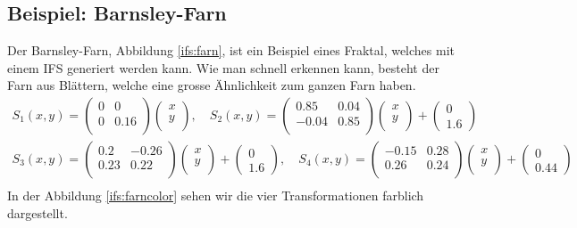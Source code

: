 \subsection{Beispiel: Barnsley-Farn}
Der Barnsley-Farn, Abbildung \ref{ifs:farn}, ist ein Beispiel eines Fraktal, welches mit einem IFS generiert werden kann.
Wie man schnell erkennen kann, besteht der Farn aus Blättern, welche eine grosse Ähnlichkeit zum ganzen Farn haben.
\begin{align*}
	{S_1(x,y)}
	= 
	\begin{pmatrix}
		0 & 0 \\
		0 & 0.16 \\
	\end{pmatrix}
	\begin{pmatrix}
		x\\
		y\\
	\end{pmatrix}, \quad
	{S_2(x,y)}
	= 
	\begin{pmatrix}
		0.85 & 0.04 \\
		-0.04 & 0.85 \\
	\end{pmatrix}
	\begin{pmatrix}
		x\\
		y\\
	\end{pmatrix} 
	+
	\begin{pmatrix}
		0 \\
		1.6
	\end{pmatrix}\\
	{S_3(x,y)}
	= 
	\begin{pmatrix}
		0.2 & -0.26 \\
		0.23 & 0.22 \\
	\end{pmatrix}
	\begin{pmatrix}
		x\\
		y\\
	\end{pmatrix} 
	+
	\begin{pmatrix}
		0 \\
		1.6
	\end{pmatrix}, \quad
	{S_4(x,y)}
	= 
	\begin{pmatrix}
		-0.15 & 0.28 \\
		0.26 & 0.24 \\
	\end{pmatrix}
	\begin{pmatrix}
		x\\
		y\\
	\end{pmatrix} 
	+
	\begin{pmatrix}
		0 \\
		0.44
	\end{pmatrix}\\
\end{align*}
In der Abbildung \ref{ifs:farncolor} sehen wir die vier Transformationen farblich dargestellt.

